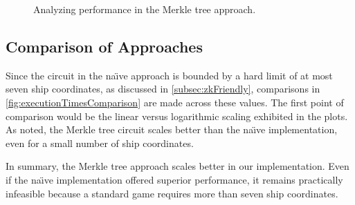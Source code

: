 \begin{figure}
    \caption{Analyzing performance in the Merkle tree approach.}
    \label{fig:executionTimesMerkle}
\end{figure}

\subsection{Comparison of Approaches}

Since the circuit in the na{\"\i}ve approach is bounded by a hard limit of at most seven ship coordinates, as discussed in \cref{subsec:zkFriendly}, comparisons in \cref{fig:executionTimesComparison} are made across these values. The first point of comparison would be the linear versus logarithmic scaling exhibited in the plots. As noted, the Merkle tree circuit scales better than the na{\"\i}ve implementation, even for a small number of ship coordinates.

In summary, the Merkle tree approach scales better in our implementation. Even if the na{\"\i}ve implementation offered superior performance, it remains practically infeasible because a standard game requires more than seven ship coordinates.

